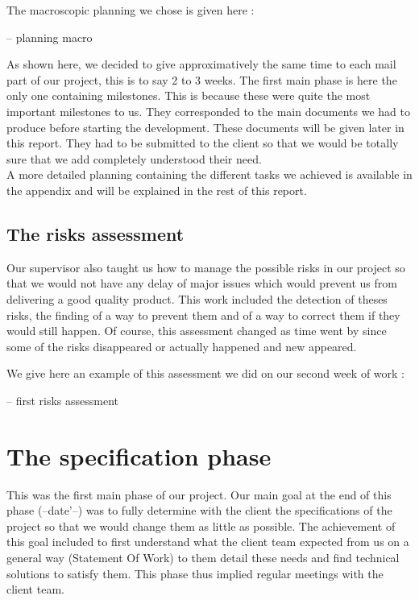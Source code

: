 \documentclass{report}
\begin{document}
The macroscopic planning we chose is given here :

\bigskip
-- planning macro
\bigskip

As shown here, we decided to give approximatively the same time to each mail part of our project, this is to say 2 to 3 weeks. The first main phase is here the only one containing milestones. This is because these were quite the most important milestones to us. They corresponded to the main documents we had to produce before starting the development. These documents will be given later in this report. They had to be submitted to the client so that we would be totally sure that we add completely understood their need. \\

A more detailed planning containing the different tasks we achieved is available in the appendix and will be explained in the rest of this report.

\section{The risks assessment}

Our supervisor also taught us how to manage the possible risks in our project so that we would not have any delay of major issues which would prevent us from delivering a good quality product. This work included the detection of theses risks, the finding of a way to prevent them and of a way to correct them if they would still happen. Of course, this assessment changed as time went by since some of the risks disappeared or actually happened and new appeared.

We give here an example of this assessment we did on our second week of work :

\bigskip
-- first risks assessment
\bigskip

\chapter{The specification phase}

This was the first main phase of our project. Our main goal at the end of this phase (--date'--)  was to fully determine with the client the specifications of the project so that we would change them as little as possible. The achievement  of this goal included to first understand what the client team expected from us on a general way (Statement Of Work) to them detail these needs and find technical solutions to satisfy them. This phase thus implied regular meetings with the client team.
\end{document}
